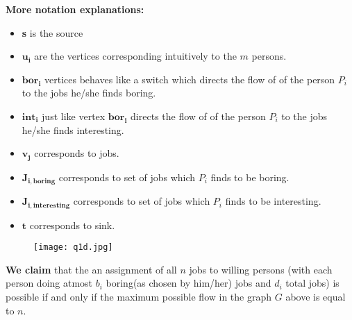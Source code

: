 \documentclass[11pt, fleqn]{article}
\begin{document}
\textbf{More notation explanations: } \begin{itemize}
    \item \textbf{s} is the source 
    
    \item $\boldsymbol{u_i}$ are the vertices corresponding intuitively to the $m$ persons.
    
    \item $\boldsymbol{bor_i}$ vertices behaves like a switch which directs the flow of of the person $P_i$ to the jobs he/she finds boring.
    
    \item $\boldsymbol{int_i}$ just like vertex $\boldsymbol{bor_i}$ directs the flow of of the person $P_i$ to the jobs he/she finds interesting.
    
    \item $\boldsymbol{v_j}$ corresponds to jobs.
    
    \item $\boldsymbol{J_{i,boring}}$ corresponds to set of jobs which $P_i$ finds to be boring.
    
    \item $\boldsymbol{J_{i,interesting}}$ corresponds to set of jobs which $P_i$ finds to be interesting.
    
    \item $\boldsymbol{t}$ corresponds to sink.
\end{itemize}

\begin{figure}[hbt!]
\centering
\begin{minipage}{1.0\textwidth}
  \centering
  \texttt{[image: q1d.jpg]}
\end{minipage}
\end{figure}

\textbf{We claim} that the an assignment of all $n$ jobs to willing persons (with each person doing atmost $b_i$ boring(as chosen by him/her) jobs and $d_i$  total jobs) is possible if and only if the maximum possible flow in the graph $G$ above is equal to $n$.

\bigskip
\end{document}
